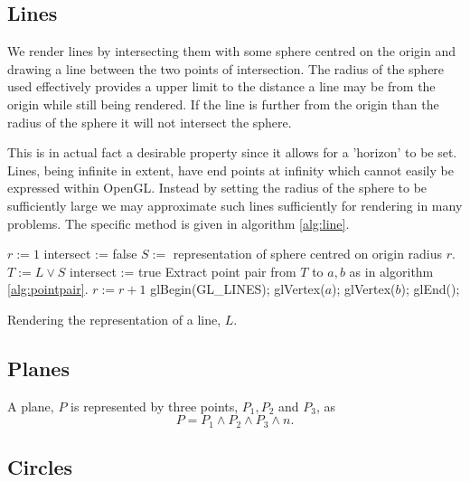 \subsection{Lines}

We render lines by intersecting them with some sphere centred on the origin
and drawing a line between the two points of intersection. The radius of the
sphere used effectively provides a upper limit to the distance a line may be
from the origin while still being rendered. If the line is further from the 
origin than the radius of the sphere it will not intersect the sphere.

This is in actual fact a desirable property since it allows for a 'horizon' to
be set. Lines, being infinite in extent, have end points at infinity which
cannot easily be expressed within OpenGL. Instead by setting the radius of the sphere
to be sufficiently large we may approximate such lines sufficiently for rendering
in many problems. The specific method is given in algorithm \ref{alg:line}.

\begin{fancyalg}
\begin{algorithmic}[1]
\STATE $r := 1$
\REPEAT
\STATE intersect := false
\STATE $S := $ representation of sphere centred on origin radius $r$.
\STATE $T := L \vee S$
\STATE intersect := true
\STATE Extract point pair from $T$ to $a,b$ as in algorithm \ref{alg:pointpair}.
\ENDIF
\STATE $r := r+1$
\STATE glBegin(GL\_LINES);
\STATE glVertex($a$); glVertex($b$);
\STATE glEnd();
\ENDIF
\end{algorithmic}
\caption{\label{alg:line}Rendering the representation of a line, $L$.}
\end{fancyalg}

\subsection{Planes}

A plane, $P$ is represented by three points, $P_1, P_2$ and $P_3$, as
\[
P = P_1 \wedge P_2 \wedge P_3 \wedge n.
\]


\subsection{Circles}

